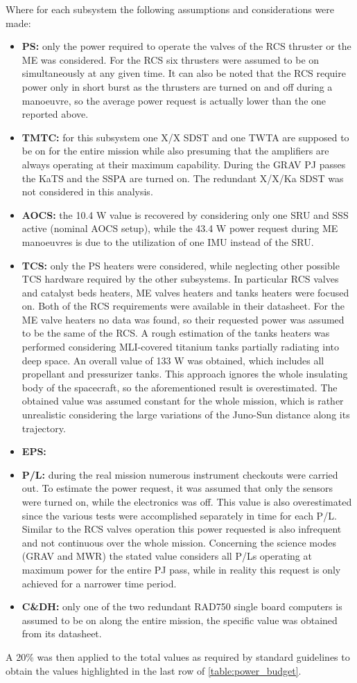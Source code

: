 Where for each subsystem the following assumptions and considerations were made:
\begin{itemize}
    \item \textbf{PS:} only the power required to operate the valves of the RCS thruster or the ME was considered. For the RCS six thrusters were assumed to be on simultaneously at any given time. It can also be noted that the RCS require power only in short burst as the thrusters are turned on and off during a manoeuvre, so the average power request is actually lower than the one reported above.
    \item \textbf{TMTC:} for this subsystem one X/X SDST and one TWTA are supposed to be on for the entire mission while also presuming that the amplifiers are always operating at their maximum capability. During the GRAV PJ passes the KaTS and the SSPA are turned on. The redundant X/X/Ka SDST was not considered in this analysis.
    \item \textbf{AOCS:} the 10.4 W value is recovered by considering only one SRU and SSS active (nominal AOCS setup), while the 43.4 W power request during ME manoeuvres is due to the utilization of one IMU instead of the SRU.
    \item \textbf{TCS:} only the PS heaters were considered, while neglecting other possible TCS hardware required by the other subsystems. In particular RCS valves and catalyst beds heaters, ME valves heaters and tanks heaters were focused on. Both of the RCS requirements were available in their datasheet. \cite{RCS_values}
    For the ME valve heaters no data was found, so their requested power was assumed to be the same of the RCS. A rough estimation of the tanks heaters was performed considering MLI-covered titanium tanks partially radiating into deep space. An overall value of 133 W was obtained, which includes all propellant and pressurizer tanks. This approach ignores the whole insulating body of the spacecraft, so the aforementioned result is overestimated. The obtained value was assumed constant for the whole mission, which is rather unrealistic considering the large variations of the Juno-Sun distance along its trajectory.  
    \item \textbf{EPS:}
    \item \textbf{P/L:} during the real mission numerous instrument checkouts were carried out. To estimate the power request, it was assumed that only the sensors were turned on, while the electronics was off. This value is also overestimated since the various tests were accomplished separately in time for each P/L. Similar to the RCS valves operation this power requested is also infrequent and not continuous over the whole mission. 
    Concerning the science modes (GRAV and MWR) the stated value considers all P/Ls operating at maximum power for the entire PJ pass, while in reality this request is only achieved for a narrower time period. \cite{LL_complete_mission} 
    \item \textbf{C\&DH:} only one of the two redundant RAD750 single board computers is assumed to be on along the entire mission, the specific value was obtained from its datasheet. \cite{C&DH_power}
\end{itemize}
A 20\% was then applied to the total values as required by standard guidelines \cite{esa_margins} to obtain the values highlighted in the last row of \autoref{table:power_budget}.